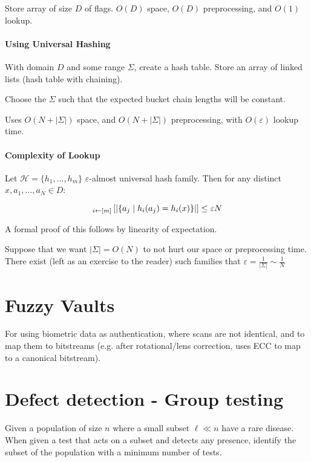 \documentclass{idc_msc}
\let\E\relax
\DeclareMathOperator*{\E}{E}
\begin{document}
Store array of size \(D\) of flags. \(O(D)\) space, \(O(D)\) preprocessing, and \(O(1)\) lookup.

\paragraph{Using Universal Hashing}

With domain \(D\) and some range \(\Sigma\), create a hash table.
Store an array of linked lists (hash table with chaining).

Choose the \(\Sigma\) such that the expected bucket chain lengths will be constant.

Uses \(O(N + |\Sigma|)\) space, and \(O(N + |\Sigma|)\) preprocessing, with \(O(\varepsilon)\) lookup time.

\paragraph{Complexity of Lookup}

Let \(\mathcal{H} = \{h_1,\ldots,h_m\}\) \(\varepsilon\)-almost universal hash family.
Then for any distinct \(x, a_1, \ldots,a_N \in D\):

\[
\E_{i \gets [m]}\left[|\{a_j \mid h_i(a_j) = h_i(x) \}|\right] \le \varepsilon N
\]

A formal proof of this follows by linearity of expectation.

Suppose that we want \(|\Sigma| = O(N)\) to not hurt our space or preprocessing time.
There exist (left as an exercise to the reader) such families that \(\varepsilon = \frac{1}{|\Sigma|} \sim \frac{1}{N}\)

\section{Fuzzy Vaults}

For using biometric data as authentication, where scans are not identical, and to map them to bitstreams (e.g. after rotational/lens correction, uses ECC to map to a canonical bitstream).

\section{Defect detection - Group testing}

Given a population of size \(n\) where a small subset \(\ell \ll n\) have a rare disease.
When given a test that acts on a subset and detects any presence, identify the subset of the population with a minimum number of tests.
\end{document}

